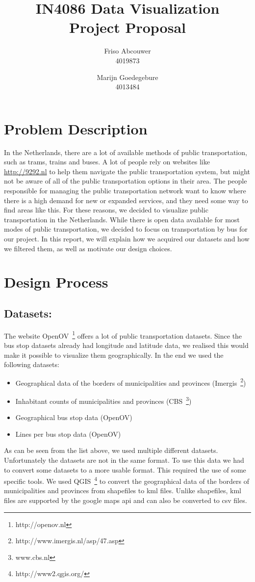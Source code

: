 \documentclass[a4paper,11pt]{article}
\title{IN4086 Data Visualization \\
Project Proposal \\ }
\author{
Friso Abcouwer \\
4019873 \\
\and
Marijn Goedegebure \\
4013484
}
\begin{document}
\maketitle{}
\newpage

\section{Problem Description}
In the Netherlands, there are a lot of available methods of public transportation, such as trams, trains and buses.
A lot of people rely on websites like \url{http://9292.nl} to help them navigate the public transportation system, but might not be aware of all of the public transportation options in their area. The people responsible for managing the public transportation network want to know where there is a high demand for new or expanded services, and they need some way to find areas like this.
For these reasons, we decided to visualize public transportation in the Netherlands. While there is open data available for most modes of public transportation, we decided to focus on transportation by bus for our project. In this report, we will explain how we acquired our datasets and how we filtered them, as well as motivate our design choices.  

\section{Design Process}
\subsection{Datasets:}
The website OpenOV~\footnote{http://openov.nl} offers a lot of public transportation datasets. Since the bus stop datasets already had longitude and latitude data, we realised this would make it possible to visualize them geographically. In the end we used the following datasets:
\begin{itemize}
\item Geographical data of the borders of municipalities and provinces (Imergis~\footnote{http://www.imergis.nl/asp/47.asp})
\item Inhabitant counts of municipalities and provinces (CBS~\footnote{www.cbs.nl})
\item Geographical bus stop data (OpenOV)
\item Lines per bus stop data (OpenOV)
\end{itemize}

As can be seen from the list above, we used multiple different datasets. Unfortunately the datasets are not in the same format. To use this data we had to convert some datasets to a more usable format. This required the use of some specific tools. We used QGIS~\footnote{http://www2.qgis.org/} to convert the geographical data of the borders of municipalities and provinces from shapefiles to kml files. Unlike shapefiles, kml files are supported by the google maps api and can also be converted to csv files.
\end{document}
